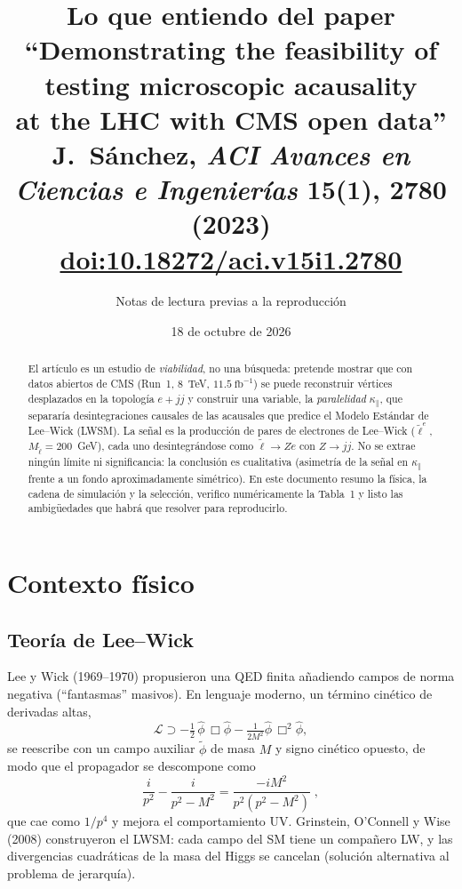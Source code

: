 \documentclass[11pt,a4paper]{article}
\title{\textbf{Lo que entiendo del paper}\\[4pt]
\large ``Demonstrating the feasibility of testing microscopic acausality\\ at the LHC with CMS open data''\\[2pt]
\normalsize J.~Sánchez, \emph{ACI Avances en Ciencias e Ingenierías} \textbf{15}(1), 2780 (2023)\\
\href{https://doi.org/10.18272/aci.v15i1.2780}{doi:10.18272/aci.v15i1.2780}}
\author{Notas de lectura previas a la reproducción}
\date{18 de octubre de 2026}
\newcommand{\lt}{\tilde{\ell}}
\newcommand{\kpar}{\kappa_{\parallel}}
\begin{document}
\maketitle

\begin{abstract}
\noindent El artículo es un estudio de \emph{viabilidad}, no una búsqueda: pretende mostrar que con datos abiertos de CMS (Run~1, 8~TeV, $11.5~\mathrm{fb}^{-1}$) se puede reconstruir vértices desplazados en la topología $e+jj$ y construir una variable, la \emph{paralelidad} $\kpar$, que separaría desintegraciones causales de las acausales que predice el Modelo Estándar de Lee--Wick (LWSM). La señal es la producción de pares de electrones de Lee--Wick ($\lt^{e}$, $M_{\lt}=200$~GeV), cada uno desintegrándose como $\lt\to Ze$ con $Z\to jj$. No se extrae ningún límite ni significancia: la conclusión es cualitativa (asimetría de la señal en $\kpar$ frente a un fondo aproximadamente simétrico). En este documento resumo la física, la cadena de simulación y la selección, verifico numéricamente la Tabla~1 y listo las ambigüedades que habrá que resolver para reproducirlo.
\end{abstract}

\tableofcontents

\section{Contexto físico}

\subsection{Teoría de Lee--Wick}
Lee y Wick (1969--1970) propusieron una QED finita añadiendo campos de norma negativa (``fantasmas'' masivos). En lenguaje moderno, un término cinético de derivadas altas,
\begin{equation}
\mathcal{L}\supset -\tfrac12\,\hat\phi\,\Box\hat\phi-\tfrac{1}{2M^2}\hat\phi\,\Box^2\hat\phi ,
\end{equation}
se reescribe con un campo auxiliar $\tilde\phi$ de masa $M$ y signo cinético opuesto, de modo que el propagador se descompone como
\begin{equation}
\frac{i}{p^2}-\frac{i}{p^2-M^2}=\frac{-iM^2}{p^2(p^2-M^2)}\;,
\end{equation}
que cae como $1/p^4$ y mejora el comportamiento UV. Grinstein, O'Connell y Wise (2008) construyeron el LWSM: cada campo del SM tiene un compañero LW, y las divergencias cuadráticas de la masa del Higgs se cancelan (solución alternativa al problema de jerarquía).
\end{document}
